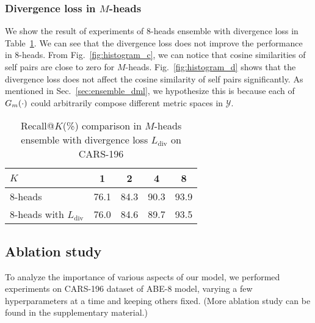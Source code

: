 \documentclass[runningheads]{llncs}
\begin{document}
\vspace{-6mm}
\subsubsection{Divergence loss in $M$-heads}
We show the result of experiments of 8-heads ensemble with divergence loss in Table~\ref{table:divlosseffect}.
We can see that the divergence loss does not improve the performance in 8-heads.
From Fig.~\ref{fig:histogram_c}, we can notice that cosine similarities of self pairs are close to zero for $M$-heads.
Fig.~\ref{fig:histogram_d} shows that the divergence loss does not affect
 the cosine similarity of self pairs significantly.
As mentioned in Sec.~\ref{sec:ensemble_dml}, we hypothesize this is because each of $G_m (\cdot)$ could arbitrarily compose different metric spaces in $\mathcal{Y}$.




\setlength{\tabcolsep}{4pt}
\begin{table}
\begin{center}
\caption{Recall@$K$(\%) comparison in $M$-heads ensemble with divergence loss $L_\mathrm{div}$ on CARS-196}
\label{table:divlosseffect}
\scriptsize
\begin{tabular}{l  c c c c}
\hline
$K$ & 1 & 2 & 4 & 8 \\
\hline
8-heads & 76.1 & 84.3 & 90.3 & 93.9 \\
8-heads with $L_\mathrm{div}$ & 76.0 & 84.6 & 89.7 & 93.5 \\
\hline
\end{tabular}
\end{center}
\end{table}
\setlength{\tabcolsep}{1.4pt}



\vspace{-10mm}
\subsection{Ablation study} \label{sec:ablation}


To analyze the importance of various aspects of our model, we performed experiments on CARS-196 dataset of ABE-$8$ model, varying a few hyperparameters at a time and keeping others fixed. (More ablation study can be found in the supplementary material.)
\end{document}
